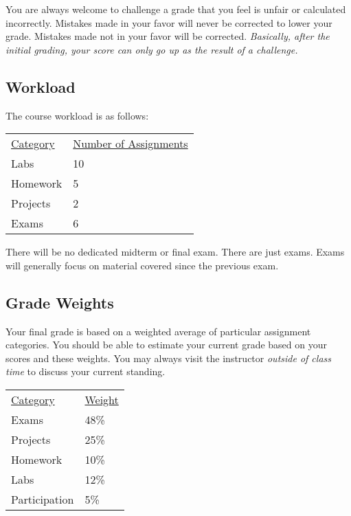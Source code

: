 \documentclass[10pt]{article}
\begin{document}
You are always welcome to challenge a grade that you feel is unfair or calculated incorrectly.  Mistakes made in your favor will never be corrected to lower your grade.  Mistakes made not in your favor will be corrected.  \textit{Basically, after the initial grading, your score can only go up as the result of a challenge.}

\subsection{Workload}

The course workload is as follows:
\begin{center}
  \begin{tabular}{ll}
    \underline{Category} & \underline{Number of Assignments} \\
    Labs & 10 \\
    Homework & 5 \\
    Projects & 2 \\
    Exams & 6
  \end{tabular}
\end{center}

There will be no dedicated midterm or final exam. There are just exams.  Exams will generally focus on material covered since the previous exam.

\subsection{Grade Weights}

Your final grade is based on a weighted average of particular assignment categories.  You should be able to estimate your current grade based on your scores and these weights.  You may always visit the instructor \textit{outside of class time} to discuss your current standing.

\begin{center}
  \begin{tabular}{ll}
  \underline{Category} & \underline{Weight} \\
    Exams & 48\% \\ %
    Projects & 25\% \\ %
    Homework & 10\% \\ %
    Labs & 12\% \\ %
    Participation & 5\%
  \end{tabular}
\end{center}
\end{document}
